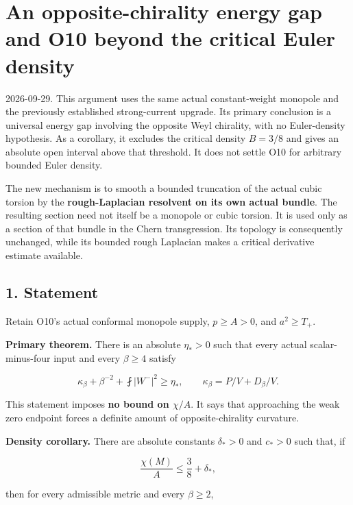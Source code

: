 \hypertarget{o10critical:an-opposite-chirality-energy-gap-and-o10-beyond-the-critical-euler-density}{%
\section{An opposite-chirality energy gap and O10 beyond the critical
Euler
density}\label{o10critical:an-opposite-chirality-energy-gap-and-o10-beyond-the-critical-euler-density}}

2026-09-29. This argument uses the same actual constant-weight monopole
and the previously established strong-current upgrade. Its primary
conclusion is a universal energy gap involving the opposite Weyl
chirality, with no Euler-density hypothesis. As a corollary, it excludes
the critical density \(B=3/8\) and gives an absolute open interval above
that threshold. It does not settle O10 for arbitrary bounded Euler
density.

The new mechanism is to smooth a bounded truncation of the actual cubic
torsion by the \textbf{rough-Laplacian resolvent on its own actual
bundle}. The resulting section need not itself be a monopole or cubic
torsion. It is used only as a section of that bundle in the Chern
transgression. Its topology is consequently unchanged, while its bounded
rough Laplacian makes a critical derivative estimate available.

\hypertarget{o10critical:statement}{%
\subsection{1. Statement}\label{o10critical:statement}}

Retain O10's actual conformal monopole supply, \(p\ge A>0\), and
\(a^2\ge T_+\).

\textbf{Primary theorem.} There is an absolute \(\eta_*>0\) such that
every actual scalar-minus-four input and every \(\beta\ge4\) satisfy

\[
 \boxed{\kappa_\beta+\beta^{-2}+\fint|W^-|^2\ge\eta_*,
 \qquad \kappa_\beta=P/V+D_\beta/V.}\tag{0}
\]

This statement imposes \textbf{no bound on \(\chi/A\)}. It says that
approaching the weak zero endpoint forces a definite amount of
opposite-chirality curvature.

\textbf{Density corollary.} There are absolute constants \(\delta_*>0\)
and \(c_*>0\) such that, if

\[
 \frac{\chi(M)}A\le\frac38+\delta_*,
\]

then for every admissible metric and every \(\beta\ge2\),

